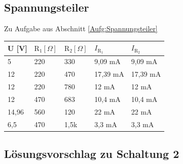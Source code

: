 \documentclass[aspectratio=169, ignorenonframetext]{beamer}
\begin{document}
\subsection{Spannungsteiler}
\begin{frame}
\label{Lsg:Spannungsteiler}
Zu Aufgabe aus Abschnitt \ref{Aufg:Spannungsteiler}

\begin{tabular}{l|ll|ll}
U [V] & $\text{R}_1 [\Omega]$& $\text{R}_2 [\Omega]$& $I_{\text{R}_1}$ & $I_{\text{R}_2}$\\ \hline
5     & 220 & 330  & 9,09 mA  & 9,09 mA  \\
12    & 220 & 470  & 17,39 mA & 17,39 mA \\
12    & 220 & 780  & 12 mA    & 12 mA    \\
12    & 470 & 683  & 10,4 mA  & 10,4 mA  \\
14,96 & 560 & 120  & 22 mA    & 22 mA    \\
6,5   & 470 & 1,5k &  3,3 mA  &  3,3 mA  \\
\end{tabular}
\end{frame}
\subsection{Lösungsvorschlag zu Schaltung 2}
\end{document}
